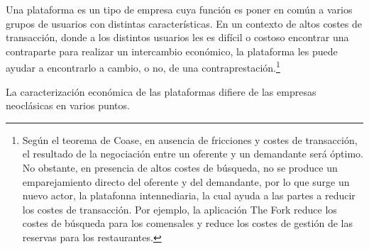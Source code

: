 \documentclass[10pt,a4paper]{article}
\begin{document}
Una plataforma es un tipo de empresa cuya función es poner en común a varios grupos de usuarios con distintas características. En un contexto de altos costes de transacción, donde a los distintos usuarios les es difícil o costoso encontrar una contraparte para realizar un intercambio económico, la plataforma les puede ayudar a encontrarlo a cambio, o no, de una contraprestación.\footnote{%
    Según el teorema de Coase, en ausencia de fricciones y costes de transacción, el resultado de la negociación entre un oferente y un demandante será óptimo. No obstante, en presencia de altos costes de búsqueda, no se produce un emparejamiento directo del oferente y del demandante, por lo que surge un nuevo actor, la platafonna intennediaria, la cual ayuda a las partes a reducir los costes de transacción. Por ejemplo, la aplicación The Fork reduce los costes de búsqueda para los comensales y reduce los costes de gestión de las reservas para los restaurantes.
}

La caracterización económica de las plataformas difiere de las empresas neoclásicas en varios puntos.
\end{document}
